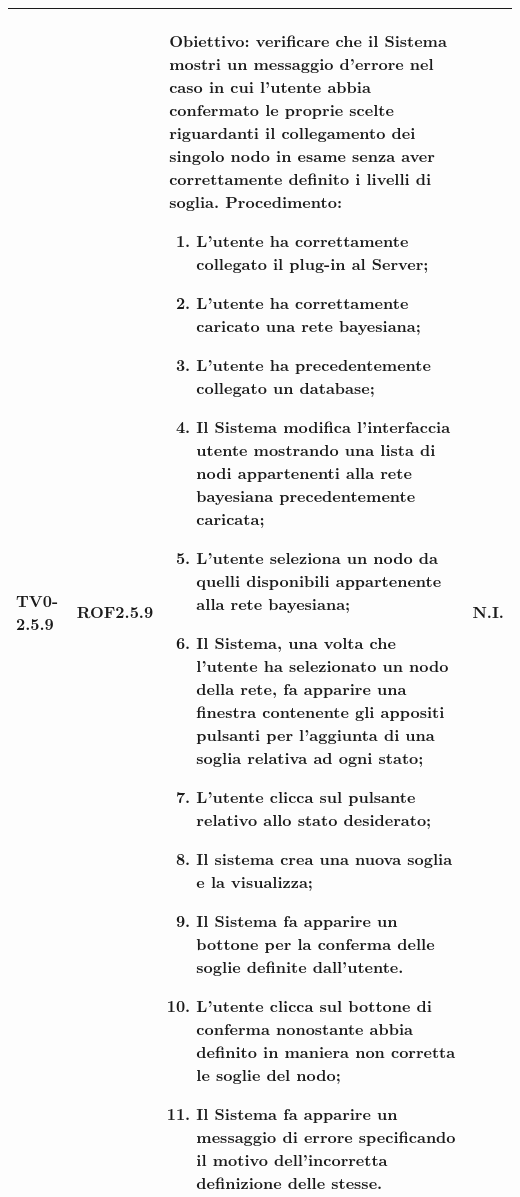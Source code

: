\begin{longtable}{|C{.15\textwidth}|C{.13\textwidth}|m{.65\textwidth}|C{.08\textwidth}|}
TV0-2.5.9 & ROF2.5.9 &
	\textbf{Obiettivo}: verificare che il Sistema mostri un messaggio d'errore nel caso in cui l'utente abbia confermato le proprie scelte riguardanti il collegamento dei singolo nodo in esame senza aver correttamente definito i livelli di soglia. \newline
	\textbf{Procedimento}:
	\begin{enumerate}
		\setlength\itemsep{0pt}
		\item L'utente ha correttamente collegato il plug-in al Server;
		\item L'utente ha correttamente caricato una rete bayesiana;
		\item L'utente ha precedentemente collegato un database;
		\item Il Sistema modifica l'interfaccia utente mostrando una lista di nodi appartenenti alla rete bayesiana precedentemente caricata;
		\item L'utente seleziona un nodo da quelli disponibili appartenente alla rete bayesiana;
		\item Il Sistema, una volta che l'utente ha selezionato un nodo della rete, fa apparire una finestra contenente gli appositi pulsanti per l'aggiunta di una soglia relativa ad ogni stato;
		\item L'utente clicca sul pulsante relativo allo stato desiderato;
		\item Il sistema crea una nuova soglia e la visualizza;
		\item Il Sistema fa apparire un bottone per la conferma delle soglie definite dall'utente.
		\item L'utente clicca sul bottone di conferma nonostante abbia definito in maniera non corretta le soglie del nodo;
		\item Il Sistema fa apparire un messaggio di errore specificando il motivo dell'incorretta definizione delle stesse.
	\end{enumerate}
	& N.I. \\
\hline


\end{longtable}
